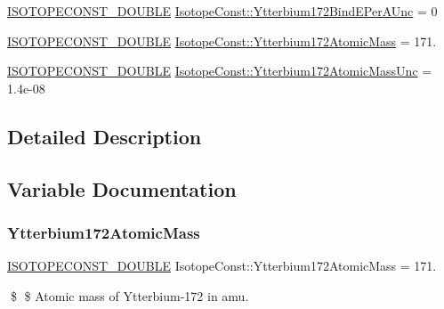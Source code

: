 \begin{DoxyCompactItemize}
\mbox{\hyperlink{group___isotope_const-_macros_ga8f45a7272ce02c0b4c65c44636ed719a}{I\+S\+O\+T\+O\+P\+E\+C\+O\+N\+S\+T\+\_\+\+D\+O\+U\+B\+LE}} \mbox{\hyperlink{group___isotope_const-_ytterbium-_yb172_gab72bc59e2b1f99a135b48a0eb34e272c}{Isotope\+Const\+::\+Ytterbium172\+Bind\+E\+Per\+A\+Unc}} = 0
\item 
\mbox{\hyperlink{group___isotope_const-_macros_ga8f45a7272ce02c0b4c65c44636ed719a}{I\+S\+O\+T\+O\+P\+E\+C\+O\+N\+S\+T\+\_\+\+D\+O\+U\+B\+LE}} \mbox{\hyperlink{group___isotope_const-_ytterbium-_yb172_gad4ae83ff19727cfc8503a67a2e51a422}{Isotope\+Const\+::\+Ytterbium172\+Atomic\+Mass}} = 171.
\item 
\mbox{\hyperlink{group___isotope_const-_macros_ga8f45a7272ce02c0b4c65c44636ed719a}{I\+S\+O\+T\+O\+P\+E\+C\+O\+N\+S\+T\+\_\+\+D\+O\+U\+B\+LE}} \mbox{\hyperlink{group___isotope_const-_ytterbium-_yb172_ga82956884800ce8e96ff4403204247ab3}{Isotope\+Const\+::\+Ytterbium172\+Atomic\+Mass\+Unc}} = 1.\+4e-\/08
\end{DoxyCompactItemize}


\subsection{Detailed Description}


\subsection{Variable Documentation}
\mbox{\label{group___isotope_const-_ytterbium-_yb172_gad4ae83ff19727cfc8503a67a2e51a422}} 
\subsubsection{\texorpdfstring{Ytterbium172\+Atomic\+Mass}{Ytterbium172AtomicMass}}
{\footnotesize\ttfamily \mbox{\hyperlink{group___isotope_const-_macros_ga8f45a7272ce02c0b4c65c44636ed719a}{I\+S\+O\+T\+O\+P\+E\+C\+O\+N\+S\+T\+\_\+\+D\+O\+U\+B\+LE}} Isotope\+Const\+::\+Ytterbium172\+Atomic\+Mass = 171.}

\$ \$ Atomic mass of Ytterbium-\/172 in amu. \mbox{\label{group___isotope_const-_ytterbium-_yb172_ga82956884800ce8e96ff4403204247ab3}} 
